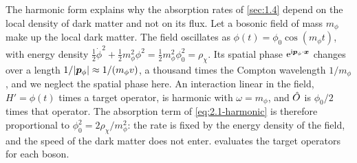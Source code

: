 The harmonic form explains why the absorption rates of \cref{sec:1.4} depend on the local density of dark matter and not on its flux. Let a bosonic field of mass $m_\phi$ make up the local dark matter. The field oscillates as $\phi(t) = \phi_0\cos(m_\phi t)$, with energy density $\tfrac12\dot\phi^2 + \tfrac12 m_\phi^2\phi^2 = \tfrac12 m_\phi^2\phi_0^2 = \rho_\chi$. Its spatial phase $\mathrm{e}^{\mathrm{i}\bm{p}_\phi\cdot\bm{x}}$ changes over a length $1/|\bm{p}_\phi| \approx 1/(m_\phi v)$, a thousand times the Compton wavelength $1/m_\phi$, and we neglect the spatial phase here. An interaction linear in the field, $H' = \phi(t)$ times a target operator, is harmonic with $\omega = m_\phi$, and $\hat{O}$ is $\phi_0/2$ times that operator. The absorption term of \cref{eq:2.1-harmonic} is therefore proportional to $\phi_0^2 = 2\rho_\chi/m_\phi^2$: the rate is fixed by the energy density of the field, and the speed of the dark matter does not enter.  evaluates the target operators for each boson.

